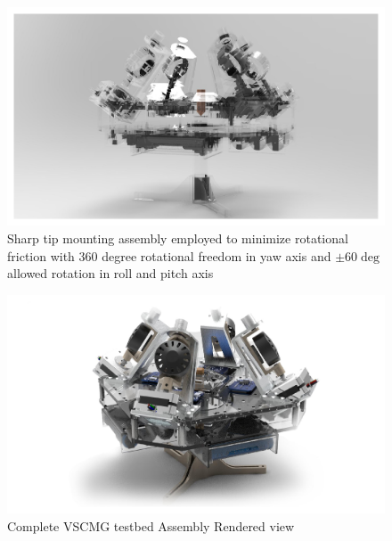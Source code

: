 \begin{figure}[ht]
    \centering
    \includegraphics[width=\textwidth]{figures/Assembly/assemblypin.pdf}
    \caption{Sharp tip mounting assembly employed to minimize rotational friction with 360 degree rotational freedom in yaw axis and $\pm 60 \deg$ allowed rotation in roll and pitch axis}
    \label{fig:PLATFORM_TIP_ASM}
\end{figure}

\begin{figure}[ht]
    \centering
    \includegraphics[width=\textwidth]{figures/Assembly/Assembly2.pdf}
    \caption{Complete VSCMG testbed Assembly Rendered view}
    \label{fig:PLATFORM_ASM_Full}
\end{figure}
